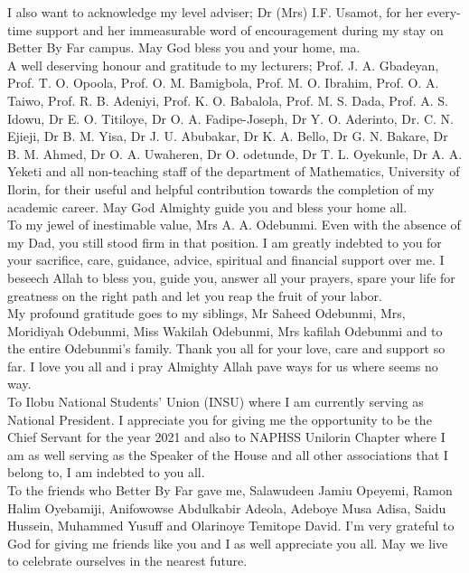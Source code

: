 I also want to acknowledge my level adviser; Dr (Mrs) I.F. Usamot, for her every-time support and her immeasurable word of encouragement during my stay on Better By Far campus. May God bless you and your home, ma.\\

A well deserving honour and gratitude to my lecturers; Prof. J. A. Gbadeyan, Prof. T. O. Opoola, Prof. O. M. Bamigbola, Prof. M. O. Ibrahim, Prof. O. A. Taiwo, Prof. R. B. Adeniyi, Prof. K. O. Babalola, Prof. M. S. Dada, Prof. A. S. Idowu, Dr E. O. Titiloye, Dr O. A. Fadipe-Joseph, Dr Y. O. Aderinto, Dr. C. N. Ejieji, Dr B. M. Yisa, Dr J. U. Abubakar, Dr K. A. Bello, Dr G. N. Bakare, Dr B. M. Ahmed, Dr O. A. Uwaheren, Dr O. odetunde, Dr T. L. Oyekunle, Dr A. A. Yeketi and all non-teaching staff of the department of Mathematics, University of Ilorin, for their useful and helpful contribution towards the completion of my academic career. May God Almighty guide you and bless your home all.\\

To my jewel of inestimable value, Mrs A. A. Odebunmi. Even with the absence of my Dad, you still stood firm in that position. I am greatly indebted to you for your sacrifice, care, guidance, advice, spiritual and financial support over me. I beseech Allah to bless you, guide you, answer all your prayers, spare your life for greatness on the right path and let you reap the fruit of your labor.\\ 

My profound gratitude goes to my siblings, Mr Saheed Odebunmi, Mrs, Moridiyah Odebunmi, Miss Wakilah Odebunmi, Mrs kafilah Odebunmi and to the entire Odebunmi's family. Thank you all for your love, care and support so far. I love you all and i pray Almighty Allah pave ways for us where seems no way.\\  

To Ilobu National Students' Union (INSU) where I am currently serving as National President. I appreciate you for giving me the opportunity to be the Chief Servant for the year 2021 and also to NAPHSS Unilorin Chapter where I am as well serving as the Speaker of the House and all other associations that I belong to, I am indebted to you all.\\

To the friends who Better By Far gave me, Salawudeen Jamiu Opeyemi, Ramon Halim Oyebamiji, Anifowowse Abdulkabir Adeola, Adeboye Musa Adisa, Saidu Hussein, Muhammed Yusuff and Olarinoye Temitope David. I'm very grateful to God for giving me friends like you and I as well appreciate you all. May we live to celebrate ourselves in the nearest future.\\

